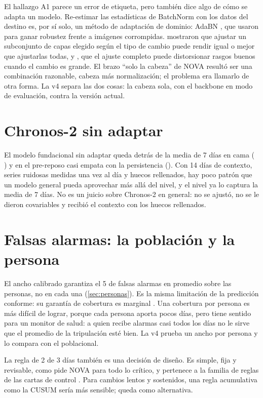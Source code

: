 El hallazgo A1 parece un error de etiqueta, pero también dice algo de cómo se adapta un modelo. Re-estimar las
estadísticas de BatchNorm con los datos del destino es, por sí solo, un método de adaptación de dominio: AdaBN
\parencite{li2018adabn}, que \textcite{schneider2020} usaron para ganar robustez frente a imágenes corrompidas.
\textcite{lee2023} mostraron que ajustar un subconjunto de capas elegido según el tipo de cambio puede rendir igual o
mejor que ajustarlas todas, y \textcite{kumar2022}, que el ajuste completo puede distorsionar rasgos buenos cuando el
cambio es grande. El brazo \enquote{solo la cabeza} de NOVA resultó ser una combinación razonable, cabeza más
normalización; el problema era llamarlo de otra forma. La v4 separa las dos cosas: la cabeza sola, con el backbone en
modo de evaluación, contra la versión actual.

\section{Chronos-2 sin adaptar}

El modelo fundacional sin adaptar queda detrás de la media de 7 días en cama (
) y en el pre-reposo casi empata con la persistencia (). Con 14
días de contexto, series ruidosas medidas una vez al día y huecos rellenados, hay poco patrón que un modelo general
pueda aprovechar más allá del nivel, y el nivel ya lo captura la media de 7 días. No es un juicio sobre Chronos-2 en
general: no se ajustó, no se le dieron covariables y recibió el contexto con los huecos rellenados.

\section{Falsas alarmas: la población y la persona}

El ancho calibrado garantiza el 5\pct{} de falsas alarmas en promedio sobre las personas, no en cada una
(\cref{sec:personas}). Es la misma limitación de la predicción conforme: su garantía de cobertura es marginal
\parencite{lei2018}. Una cobertura por persona es más difícil de lograr, porque cada persona aporta pocos días, pero
tiene sentido para un monitor de salud: a quien recibe alarmas casi todos los días no le sirve que el promedio de la
tripulación esté bien. La v4 prueba un ancho por persona y lo compara con el poblacional.

La regla de 2 de 3 días también es una decisión de diseño. Es simple, fija y revisable, como pide NOVA para todo lo
crítico, y pertenece a la familia de reglas de las cartas de control \parencite{nelson1984}. Para cambios lentos y
sostenidos, una regla acumulativa como la CUSUM \parencite{page1954} sería más sensible; queda como alternativa.

